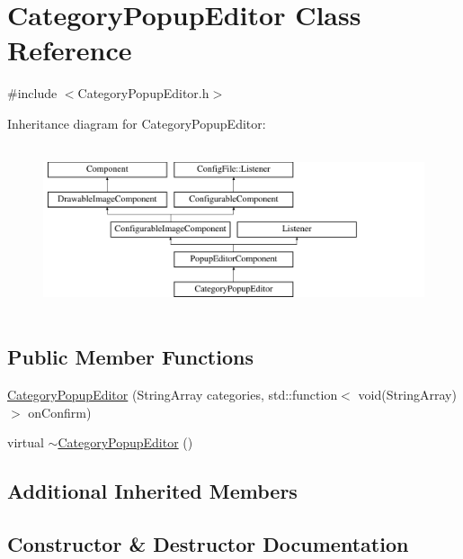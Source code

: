 \hypertarget{classCategoryPopupEditor}{}\section{Category\+Popup\+Editor Class Reference}
\label{classCategoryPopupEditor}


{\ttfamily \#include $<$Category\+Popup\+Editor.\+h$>$}

Inheritance diagram for Category\+Popup\+Editor\+:\begin{figure}[H]
\begin{center}
\leavevmode
\includegraphics[height=4.938272cm]{classCategoryPopupEditor}
\end{center}
\end{figure}
\subsection*{Public Member Functions}
\begin{DoxyCompactItemize}
\item 
\mbox{\hyperlink{classCategoryPopupEditor_a14ecd2adcc18282f16f908a82d08f37b}{Category\+Popup\+Editor}} (String\+Array categories, std\+::function$<$ void(String\+Array) $>$ on\+Confirm)
\item 
virtual \mbox{\hyperlink{classCategoryPopupEditor_a902911d16c13c37fa70f6c56b031f69a}{$\sim$\+Category\+Popup\+Editor}} ()
\end{DoxyCompactItemize}
\subsection*{Additional Inherited Members}


\subsection{Constructor \& Destructor Documentation}
\mbox{\label{classCategoryPopupEditor_a14ecd2adcc18282f16f908a82d08f37b}} 
